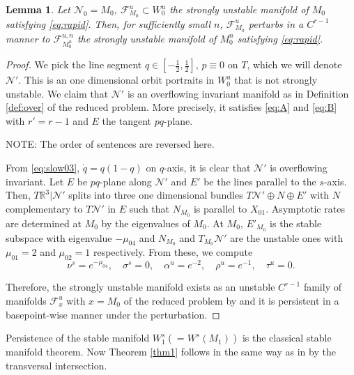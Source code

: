 \documentclass[a4paper,11pt]{article}
\def\blue{\color{blue}}
\newtheorem{lemma}{Lemma}[section]
\theoremstyle{remark}
\begin{document}
\begin{lemma} \label{lem:rapid}
 Let $\mathcal{N}_0=M_0$, $\mathcal{F}^u_{M_0}\subset W_0^u$ {\blue the strongly unstable manifold of $M_0$} satisfying \eqref{eq:rapid}. Then, for sufficiently small $n$, $\mathcal{F}^u_{M_0}$ perturbs in a $C^{r-1}$ manner to $\mathcal{F}^{u,n}_{M_0^n}$ {\blue the strongly unstable manifold of $M_0^n$} satisfying \eqref{eq:rapid}. 
\end{lemma}
\begin{proof}
 {\blue We pick the line segment $q\in [- \frac{1}{2}, \frac{1}{2}]$, $p\equiv0$ on $T$, which we will denote ${\mathcal{N}}'$. This is an one dimensional orbit portraits in $W_0^u$ that is not strongly unstable. We claim that ${\mathcal{N}}'$ is an overflowing invariant manifold as in Definition \ref{def:over} of the reduced problem. More precisely, it satisfies \eqref{eq:A} and \eqref{eq:B} with $r'=r-1$ and $E$ the tangent $pq$-plane. 
 }

 {\blue NOTE: The order of sentences are reversed here.}

 From \eqref{eq:slow03}, $\dot{q}=q(1-q)$ on $q$-axis, it is clear that ${\mathcal{N}}'$ is overflowing invariant. Let $E$ be $pq$-plane along ${\mathcal{N}}'$ and $E'$ be the lines parallel to the $s$-axis. Then, $T \mathbb{R}^3|{\mathcal{N}}'$ splits into three one dimensional bundles $T{\mathcal{N}}'\oplus N \oplus E'$ with $N$ complementary to $T{\mathcal{N}}'$ in $E$ such that $N_{M_0}$ is parallel to $X_{01}$.  %
 Asymptotic rates are determined at $M_0$ by the eigenvalues of $M_0$. At $M_0$, $E'_{M_0}$ is the stable subspace with eigenvalue $-\mu_{04}$ and $N_{M_0}$ and $T_{M_0}{\mathcal{N}}'$ are the unstable ones with $\mu_{01}=2$ and $\mu_{02}=1$ respectively. From these, we compute 
 $$ \nu^s = e^{-\mu_{04}}, \quad\sigma^s = 0, \quad\alpha^u = e^{-2}, \quad\rho^u=e^{-1}, \quad\tau^u=0.$$

 Therefore, {\blue the strongly unstable manifold} exists as an unstable $C^{r-1}$ family of manifolds $\mathcal{F}^u_x$ with $x=M_0$ of the reduced problem by \cite[Theorem 3]{fenichel_asymptotic_1977} and it is persistent in a basepoint-wise manner under the perturbation. 
\end{proof}
Persistence of the stable manifold $W_1^s (= W^s(M_1))$ is the classical stable manifold theorem. Now Theorem \ref{thm1} follows in the same way as in \cite[Theorem 3.1]{Sz1991} by the transversal intersection.
\end{document}
